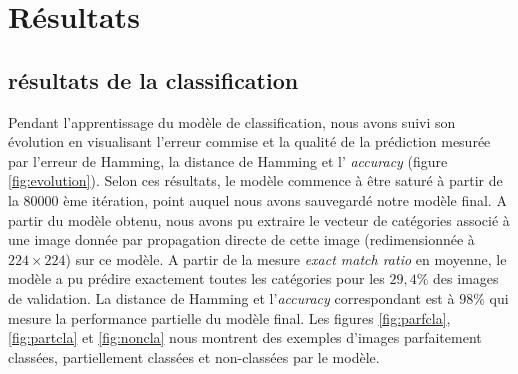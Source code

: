 \pagestyle{fancy}

\renewcommand{\footrulewidth}{1pt}

\fancyhead[L]{\footnotesize \rightmark}

\fancyfoot[C]{\thepage}





\section{Résultats} \label{resultat}

\subsection{résultats de la classification}
Pendant l'apprentissage du modèle de classification, nous avons suivi son évolution en visualisant l'erreur commise et la qualité de la prédiction mesurée par l'erreur de Hamming, la distance de Hamming et l' \textit{accuracy} (figure \ref{fig:evolution}). Selon ces résultats, le modèle commence à être saturé  à partir de la $80000$ ème itération, point auquel nous avons sauvegardé notre modèle final.
A partir du modèle obtenu, nous avons pu extraire le vecteur de catégories associé à une image donnée par propagation directe de cette image (redimensionnée à $224 \times 224$) sur ce modèle. A partir de la mesure \textit{exact match ratio} en moyenne, le modèle a pu prédire exactement toutes les catégories pour les $29,4\%$  des images de validation. La distance de Hamming  et l'\textit{accuracy} correspondant est à $98\%$ qui mesure la performance partielle du modèle final. Les figures \ref{fig:parfcla}, \ref{fig:partcla} et \ref{fig:noncla} nous montrent des exemples d'images parfaitement classées, partiellement classées et non-classées par le modèle.\\

